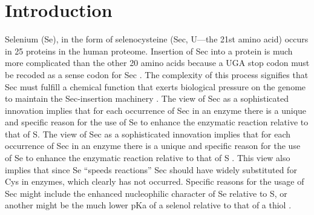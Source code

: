 
\section{Introduction}

Selenium (Se), in the form of selenocysteine (Sec, U—the 21st amino acid) occurs in 25 proteins in the human proteome. Insertion of Sec into a protein is much more complicated than the other 20 amino acids because a UGA stop codon must be recoded as a sense codon for Sec \cite{hondal_differing_2011}. The complexity of this process signifies that Sec must fulfill a chemical function that exerts biological pressure on the genome to maintain the Sec-insertion machinery \cite{hondal_differing_2011,cardey_selenocysteine_2007}. The view of Sec as a sophisticated innovation implies that for each occurrence of Sec in an enzyme there is a unique and specific reason for the use of Se to enhance the enzymatic reaction relative to that of S\cite{hondal_differing_2011}. The view of Sec as a sophisticated innovation implies that for each occurrence of Sec in an enzyme there is a unique and specific reason for the use of Se to enhance the enzymatic reaction relative to that of S \cite{hondal_differing_2011}. This view also implies that since Se “speeds reactions” Sec should have widely substituted for Cys in enzymes, which clearly has not occurred. Specific reasons for the usage of Sec might include the enhanced nucleophilic character of Se relative to S, or another might be the much lower pKa of a selenol relative to that of a thiol \cite{hondal_differing_2011}.

